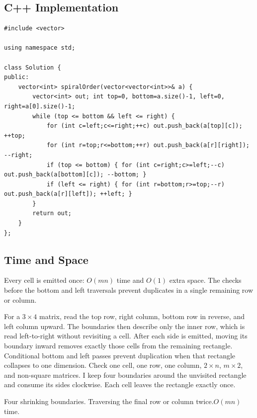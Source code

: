 \subsection{C++ Implementation}
\begin{lstlisting}[style=compactcode,caption={Complete C++ solution: Spiral Matrix}]
#include <vector>

using namespace std;

class Solution {
public:
    vector<int> spiralOrder(vector<vector<int>>& a) {
        vector<int> out; int top=0, bottom=a.size()-1, left=0, right=a[0].size()-1;
        while (top <= bottom && left <= right) {
            for (int c=left;c<=right;++c) out.push_back(a[top][c]); ++top;
            for (int r=top;r<=bottom;++r) out.push_back(a[r][right]); --right;
            if (top <= bottom) { for (int c=right;c>=left;--c) out.push_back(a[bottom][c]); --bottom; }
            if (left <= right) { for (int r=bottom;r>=top;--r) out.push_back(a[r][left]); ++left; }
        }
        return out;
    }
};
\end{lstlisting}

\subsection{Time and Space}
Every cell is emitted once: \(O(mn)\) time and \(O(1)\) extra space.
The checks before the bottom and left traversals prevent duplicates in a
single remaining row or column.

\lessonexpansion
  {For a \(3\times4\) matrix, read the top row, right column, bottom row in
   reverse, and left column upward. The boundaries then describe only the
   inner row, which is read left-to-right without revisiting a cell.}
  {After each side is emitted, moving its boundary inward removes exactly
   those cells from the remaining rectangle. Conditional bottom and left
   passes prevent duplication when that rectangle collapses to one dimension.}
  {Check one cell, one row, one column, \(2\times n\), \(m\times2\), and
   non-square matrices.}
  {I keep four boundaries around the unvisited rectangle and consume its
   sides clockwise. Each cell leaves the rectangle exactly once.}

  {Four shrinking boundaries.}
  {Traversing the final row or column twice.}{$O(mn)$ time.}



